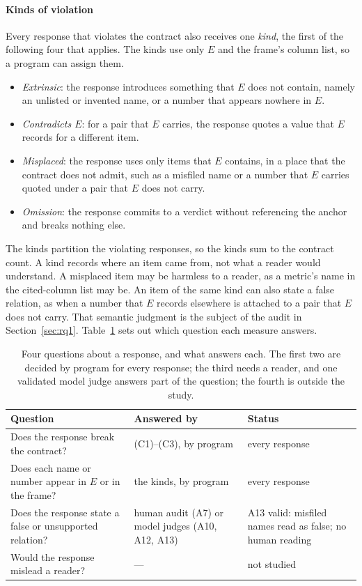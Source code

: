 \documentclass[journal]{IEEEtran}
\begin{document}
\paragraph{Kinds of violation}
Every response that violates the contract also receives one \emph{kind}, the
first of the following four that applies. The kinds use only $E$ and the
frame's column list, so a program can assign them.
\begin{itemize}
\item \emph{Extrinsic}: the response introduces something that $E$ does not
contain, namely an unlisted or invented name, or a number that appears nowhere
in $E$.
\item \emph{Contradicts $E$}: for a pair that $E$ carries, the response quotes
a value that $E$ records for a different item.
\item \emph{Misplaced}: the response uses only items that $E$ contains, in a
place that the contract does not admit, such as a misfiled name or a number
that $E$ carries quoted under a pair that $E$ does not carry.
\item \emph{Omission}: the response commits to a verdict without referencing
the anchor and breaks nothing else.
\end{itemize}
The kinds partition the violating responses, so the kinds sum to the contract
count. A kind records where an item came from, not what a reader would
understand. A misplaced item may be harmless to a reader, as a metric's name in
the cited-column list may be. An item of the same kind can also state a
false relation, as when a number that $E$ records elsewhere is attached to a
pair that $E$ does not carry. That semantic judgment is the subject of the audit in
Section~\ref{sec:rq1}.
Table~\ref{tab:questions} sets out which question each measure answers.

\begin{table}[!htbp]
\caption{Four questions about a response, and what answers each. The first
two are decided by program for every response; the third needs a reader, and
one validated model judge answers part of the question; the fourth is outside
the study.}
\label{tab:questions}
\centering
\footnotesize
\setlength{\tabcolsep}{3pt}
\begin{tabular}{@{}p{3.45cm}p{2.7cm}p{2.0cm}@{}}
\toprule
Question & Answered by & Status \\
\midrule
Does the response break the contract? & (C1)--(C3), by program & every response \\
Does each name or number appear in $E$ or in the frame? & the kinds, by program & every response \\
Does the response state a false or unsupported relation? & human audit (A7) or model judges (A10, A12, A13) & A13 valid: misfiled names read as false; no human reading \\
Would the response mislead a reader? & --- & not studied \\
\bottomrule
\end{tabular}
\end{table}
\end{document}

